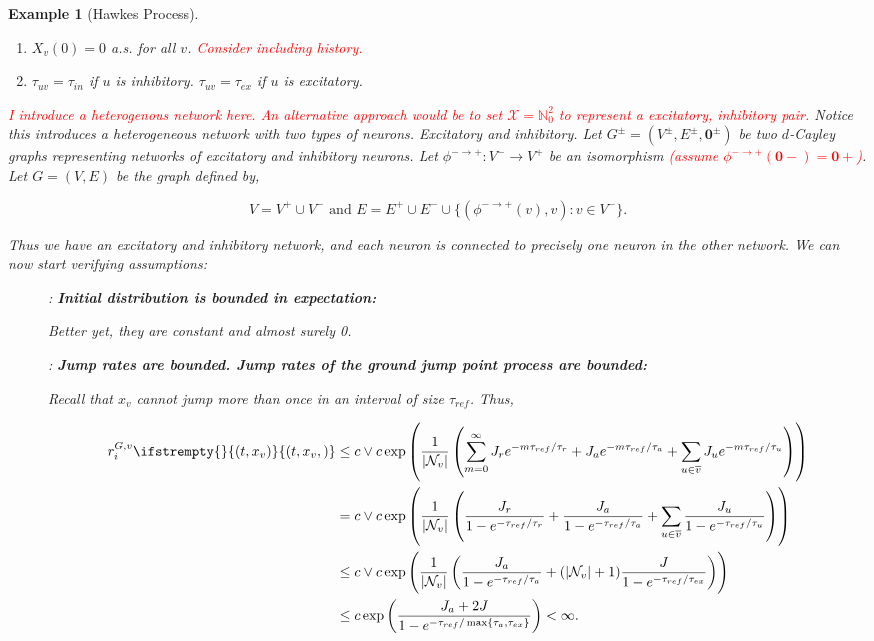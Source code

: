 \documentclass[12pt]{article}
\newcommand{\mb}{\mathbb}
\newcommand{\mc}{\mathcal}
\newcommand{\ra}{\rightarrow}
\newcommand{\ov}{\overline}
\newcommand{\te}{\text}
\newcommand{\tr}{\textcolor{red}}
\newcommand{\sta}{\mc{X}}							%
\newcommand{\neigh}[1]{\mc{N}_{#1}}				%
\newcommand{\cl}[1]{\ov{#1}}						%
\renewcommand{\root}{\mathbf{0}}					%
\newcommand{\Xf}{X}									%
\newcommand{\rate}{r}								%
\newcommand{\xf}{x}									%
\newcommand{\vind}[1]{_{#1}}						%
\newcommand{\tme}[1]{(#1)}							%
\newcommand{\stpara}[1]{_{#1}}						%
\newcommand{\gvpara}[2]{^{#1,#2}}					%
\newcommand{\tmepro}[3]{
\ifstrempty{#3}{
	\left(#1,#2\right)}{
	\left(#1,#2,#3\right)}}							%
\renewcommand{\d}{d}								%
\newtheorem{example}[thms]{Example}
\begin{document}
\begin{example}[Hawkes Process]
\begin{enumerate}
\item \(\Xf\vind{v}\tme{0} = 0\) a.s. for all \(v\). \tr{Consider including history.}

\item \(\tau_{uv} = \tau_{in}\) if \(u\) is inhibitory. \(\tau_{uv} = \tau_{ex}\) if \(u\) is excitatory.
\end{enumerate}

\tr{I introduce a heterogenous network here. An alternative approach would be to set \(\sta = \mb{N}_0^2\) to represent a excitatory, inhibitory pair.} Notice this introduces a heterogeneous network with two types of neurons. Excitatory and inhibitory. Let \(G^{\pm} = (V^\pm,E^\pm,\root^\pm)\) be two \(\d\)-Cayley graphs representing networks of excitatory and inhibitory neurons. Let \(\phi^{-\ra+}: V^- \ra V^+\) be an isomorphism \tr{(assume \(\phi^{-\ra+}(\root-) = \root+\))}. Let \(G = (V,E)\) be the graph defined by,

\[V = V^+\cup V^- \te{ and } E = E^+\cup E^-\cup \{(\phi^{-\ra+}(v),v): v \in V^-\}.\]

Thus we have an excitatory and inhibitory network, and each neuron is connected to precisely one neuron in the other network. We can now start verifying assumptions:

\begin{description}
\item[] \item[] \cite[Assumption \ref{F-a::bddinit}]{F}: \textbf{Initial distribution is bounded in expectation:}

Better yet, they are constant and almost surely 0.

\item[] \cite[Assumption \ref{F-a::bddr}]{F}: \textbf{Jump rates are bounded. Jump rates of the ground jump point process are bounded:}

Recall that \(\xf_v\) cannot jump more than once in an interval of size \(\tau_{ref}\). Thus,

\begin{align*}
\rate\gvpara{G}{v}\stpara{i}\tmepro{t}{\xf\vind{v}}{} &\leq c\vee c\exp\left(\frac{1}{|\neigh{v}|}\left(\sum_{m=0}^\infty J_re^{-m\tau_{ref}/\tau_r} + J_ae^{-m\tau_{ref}/\tau_a}+\sum_{u \in \cl{v}} J_ue^{-m\tau_{ref}/\tau_{u}}\right)\right)\\
&= c\vee c\exp\left(\frac{1}{|\neigh{v}|}\left(\frac{J_r}{1 - e^{-\tau_{ref}/\tau_r}} + \frac{J_a}{1 - e^{-\tau_{ref}/\tau_a}} + \sum_{u\in \cl{v}} \frac{J_u}{1 - e^{-\tau_{ref}/\tau_u}}\right)\right)\\
&\leq c\vee c\exp\left(\frac{1}{|\neigh{v}|}\left(\frac{J_a}{1 - e^{-\tau_{ref}/\tau_a}} + (|\neigh{v}|+1)\frac{J}{1 - e^{-\tau_{ref}/\tau_{ex}}}\right)\right)\\
&\leq c\exp\left(\frac{J_a + 2J}{1 - e^{-\tau_{ref}/\max\{\tau_a,\tau_{ex}\}}}\right) < \infty.
\end{align*}


\end{description}
\end{example}
\end{document}
